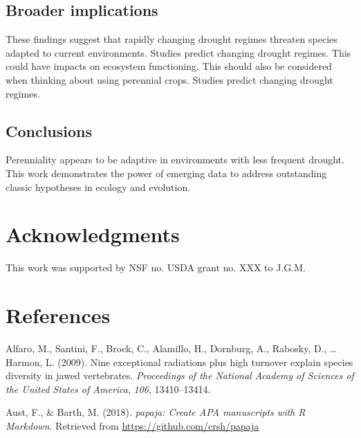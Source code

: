\documentclass[man,floatsintext]{apa6}
\theoremstyle{definition}
\theoremstyle{definition}
\theoremstyle{definition}
\theoremstyle{remark}
\begin{document}
\hypertarget{broader-implications}{%
\subsection{Broader implications}\label{broader-implications}}

These findings suggest that rapidly changing drought regimes threaten
species adapted to current environments. Studies predict changing
drought regimes. This could have impacts on ecosystem functioning. This
should also be considered when thinking about using perennial crops.
Studies predict changing drought regimes.

\hypertarget{conclusions}{%
\subsection{Conclusions}\label{conclusions}}

Perenniality appears to be adaptive in environments with less frequent
drought. This work demonstrates the power of emerging data to address
outstanding classic hypotheses in ecology and evolution.

\hypertarget{acknowledgments}{%
\section{Acknowledgments}\label{acknowledgments}}

This work was supported by NSF no. USDA grant no. XXX to J.G.M.

\hypertarget{references}{%
\section{References}\label{references}}

\newpage

\begingroup
\setlength{\parindent}{-0.5in}
\setlength{\leftskip}{0.5in}

\hypertarget{refs}{}
\leavevmode\hypertarget{ref-R-geiger_a}{}%
Alfaro, M., Santini, F., Brock, C., Alamillo, H., Dornburg, A., Rabosky,
D., \ldots{} Harmon, L. (2009). Nine exceptional radiations plus high
turnover explain species diversity in jawed vertebrates.
\emph{Proceedings of the National Academy of Sciences of the United
States of America}, \emph{106}, 13410--13414.

\leavevmode\hypertarget{ref-R-papaja}{}%
Aust, F., \& Barth, M. (2018). \emph{papaja: Create APA manuscripts with
R Markdown}. Retrieved from \url{https://github.com/crsh/papaja}
\end{document}
